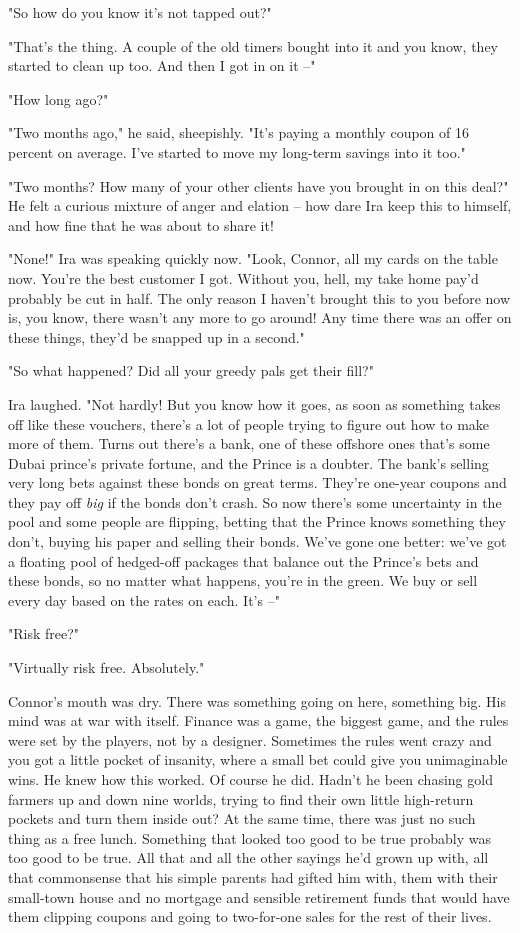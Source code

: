 "So how do you know it's not tapped out?"

"That's the thing. A couple of the old timers bought into it and
you know, they started to clean up too. And then I got in on it
--"

"How long ago?"

"Two months ago," he said, sheepishly. "It's paying a monthly
coupon of 16 percent on average. I've started to move my long-term
savings into it too."

"Two months? How many of your other clients have you brought in on
this deal?" He felt a curious mixture of anger and elation -- how
dare Ira keep this to himself, and how fine that he was about to
share it!

"None!" Ira was speaking quickly now. "Look, Connor, all my cards
on the table now. You're the best customer I got. Without you,
hell, my take home pay'd probably be cut in half. The only reason I
haven't brought this to you before now is, you know, there wasn't
any more to go around! Any time there was an offer on these things,
they'd be snapped up in a second."

"So what happened? Did all your greedy pals get their fill?"

Ira laughed. "Not hardly! But you know how it goes, as soon as
something takes off like these vouchers, there's a lot of people
trying to figure out how to make more of them. Turns out there's a
bank, one of these offshore ones that's some Dubai prince's private
fortune, and the Prince is a doubter. The bank's selling very long
bets against these bonds on great terms. They're one-year coupons
and they pay off \emph{big} if the bonds don't crash. So now
there's some uncertainty in the pool and some people are flipping,
betting that the Prince knows something they don't, buying his
paper and selling their bonds. We've gone one better: we've got a
floating pool of hedged-off packages that balance out the Prince's
bets and these bonds, so no matter what happens, you're in the
green. We buy or sell every day based on the rates on each. It's
--"

"Risk free?"

"Virtually risk free. Absolutely."

Connor's mouth was dry. There was something going on here,
something big. His mind was at war with itself. Finance was a game,
the biggest game, and the rules were set by the players, not by a
designer. Sometimes the rules went crazy and you got a little
pocket of insanity, where a small bet could give you unimaginable
wins. He knew how this worked. Of course he did. Hadn't he been
chasing gold farmers up and down nine worlds, trying to find their
own little high-return pockets and turn them inside out? At the
same time, there was just no such thing as a free lunch. Something
that looked too good to be true probably was too good to be true.
All that and all the other sayings he'd grown up with, all that
commonsense that his simple parents had gifted him with, them with
their small-town house and no mortgage and sensible retirement
funds that would have them clipping coupons and going to
two-for-one sales for the rest of their lives.

